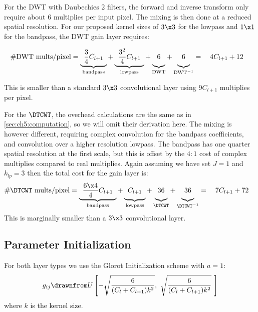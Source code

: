 For the DWT with Daubechies 2 filters, the forward and inverse transform only
require about $6$ multiplies per input pixel. The mixing is then done at a
reduced spatial resolution. For our proposed kernel sizes of $3\x 3$ for the
lowpass and $1\x 1$ for the bandpass, the DWT gain layer requires:

\begin{equation}
  \text{\#DWT mults/pixel} = \underbrace{\hphantom{1} \frac{3}{4}C_{l+1} \hphantom{1}}_{\textrm{bandpass}} +
  \underbrace{\hphantom{1}\vphantom{\frac{3}{4}} \frac{3^2}{4} C_{l+1} \hphantom{1}}_{\textrm{lowpass}} + 
  \underbrace{\vphantom{\frac{3}{4}} 6}_{\text{DWT}} + 
  \underbrace{\vphantom{\frac{3}{4}} 6}_{\text{DWT}^{-1}} = \quad 4C_{l+1} + 12 \quad
  \label{eq:ch6:comp_dwt}
\end{equation}

This is smaller than a standard $3\x 3$ convolutional layer using $9C_{l+1}$
multiplies per pixel.

For the $\DTCWT$, the overhead calculations are the same as in
\autoref{sec:ch5:computation}, so we will omit their derivation here. The mixing
is however different, requiring complex convolution for the bandpass
coefficients, and convolution over a higher resolution lowpass. The bandpass has
one quarter spatial resolution at the first scale, but this is offset by the
$4:1$ cost of complex multiplies compared to real multiplies. Again assuming we
have set $J=1$ and $k_{lp} = 3$ then the total cost for the gain layer is:
%
\begin{equation}
  \text{\#$\DTCWT$ mults/pixel} = \underbrace{\hphantom{1} \frac{6\x 4}{4}C_{l+1} \hphantom{1}}_{\textrm{bandpass}} +
  \underbrace{\hphantom{1}\vphantom{\frac{6}{4}} C_{l+1} \hphantom{1}}_{\textrm{lowpass}} + 
  \underbrace{\vphantom{\frac{6}{4}} 36}_{\DTCWT} + 
  \underbrace{\vphantom{\frac{6}{4}} 36}_{\DTCWT^{-1}} = \quad 7C_{l+1} + 72 \quad
  \label{eq:ch6:comp_dtcwt}
\end{equation}
This is marginally smaller than a $3\x 3$ convolutional layer.

\subsection{Parameter Initialization}
For both layer types we use the Glorot Initialization scheme \cite{glorot_understanding_2010}
with $a=1$: 
%
\begin{equation}
  g_{ij} \drawnfrom U\left[ -\sqrt{\frac{6}{(C_l + C_{l+1})k^2}},\ \sqrt{\frac{6}{(C_l + C_{l+1})k^2}}\
  \right] \label{eq:ch6:glorot}
\end{equation}
where $k$ is the kernel size.
% 
